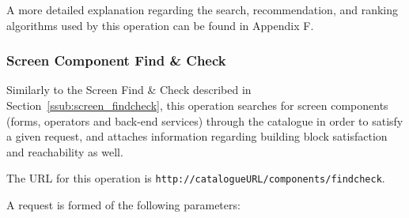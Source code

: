 \documentclass{fast_latex}
\begin{document}
A more detailed explanation regarding the search, recommendation, and ranking algorithms used by this operation can be found in Appendix F.

\subsubsection{Screen Component Find \& Check} %
\label{ssub:screen_component_findcheck}

Similarly to the Screen Find \& Check described in Section~\ref{ssub:screen_findcheck}, this operation searches for screen components (forms, operators and back-end services) through the catalogue in order to satisfy a given request, and attaches information regarding building block satisfaction and reachability as well.

The URL for this operation is \verb|http://catalogueURL/components/findcheck|.

A request is formed of the following parameters:
\end{document}
